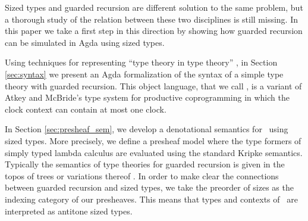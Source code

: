 



Sized types and guarded recursion are different solution to the same
problem, but a thorough study of the relation between these two
disciplines is still missing. In this paper we take a first step in
this direction by showing how guarded recursion can be simulated in
Agda using sized types. 

Using techniques for representing ``type theory in type theory''
\cite{Chapman09,AltenkirchK16}, in Section \ref{sec:syntax} we present
an Agda formalization of the syntax of a simple type theory with
guarded recursion. This object language, that we call \GTT, is a variant of Atkey and
McBride's type system for productive coprogramming
\cite{atkey2013productive} in which the clock context can contain at
most one clock.

In Section \ref{sec:presheaf_sem}, we develop a denotational semantics
for \GTT\ using sized types. More precisely, we define a presheaf
model where the type formers of simply typed lambda calculus are
evaluated using the standard Kripke semantics. Typically the semantics
of type theories for guarded recursion is given in the topos of
trees or variations thereof \cite{BMSS-synthetic} .
In order to make clear the connections between guarded recursion and
sized types, we take the preorder of sizes as the indexing
category of our presheaves. This means that types and contexts of \GTT\ are
interpreted as antitone sized types. 

